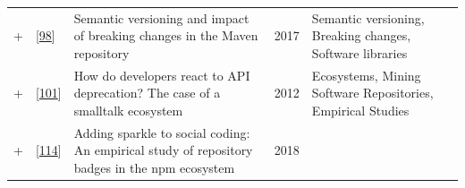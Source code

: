 \documentclass[]{book}
\begin{document}
\begin{longtable}[]{@{}lllll@{}}
\begin{minipage}[t]{0.01\columnwidth}\raggedright\strut
+\strut
\end{minipage} & \begin{minipage}[t]{0.09\columnwidth}\raggedright\strut
{[}\protect\hyperlink{ref-Raemaekers2017}{98}{]}\strut
\end{minipage} & \begin{minipage}[t]{0.34\columnwidth}\raggedright\strut
Semantic versioning and impact of breaking changes in the Maven
repository\strut
\end{minipage} & \begin{minipage}[t]{0.02\columnwidth}\raggedright\strut
2017\strut
\end{minipage} & \begin{minipage}[t]{0.39\columnwidth}\raggedright\strut
Semantic versioning, Breaking changes, Software libraries\strut
\end{minipage}\tabularnewline
\begin{minipage}[t]{0.01\columnwidth}\raggedright\strut
+\strut
\end{minipage} & \begin{minipage}[t]{0.09\columnwidth}\raggedright\strut
{[}\protect\hyperlink{ref-Robbes2012}{101}{]}\strut
\end{minipage} & \begin{minipage}[t]{0.34\columnwidth}\raggedright\strut
How do developers react to API deprecation? The case of a smalltalk
ecosystem\strut
\end{minipage} & \begin{minipage}[t]{0.02\columnwidth}\raggedright\strut
2012\strut
\end{minipage} & \begin{minipage}[t]{0.39\columnwidth}\raggedright\strut
Ecosystems, Mining Software Repositories, Empirical Studies\strut
\end{minipage}\tabularnewline
\begin{minipage}[t]{0.01\columnwidth}\raggedright\strut
+\strut
\end{minipage} & \begin{minipage}[t]{0.09\columnwidth}\raggedright\strut
{[}\protect\hyperlink{ref-Trockman2018}{114}{]}\strut
\end{minipage} & \begin{minipage}[t]{0.34\columnwidth}\raggedright\strut
Adding sparkle to social coding: An empirical study of repository badges
in the npm ecosystem\strut
\end{minipage} & \begin{minipage}[t]{0.02\columnwidth}\raggedright\strut
2018\strut
\end{minipage} & \begin{minipage}[t]{0.39\columnwidth}\raggedright\strut
\strut
\end{minipage}\tabularnewline
\bottomrule
\end{longtable}
\end{document}
